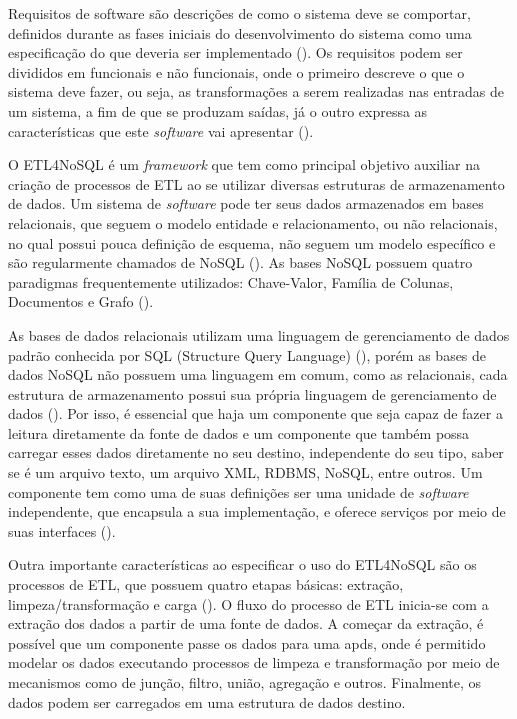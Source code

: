 Requisitos de software são descrições de como o sistema deve se comportar, definidos durante as fases iniciais do desenvolvimento do sistema como uma especificação do que deveria ser implementado (\cite{sommerville:2013}). Os requisitos podem ser divididos em funcionais e não funcionais, onde o primeiro descreve o que o sistema deve fazer, ou seja, as transformações a serem realizadas nas entradas de um sistema, a fim de que se produzam saídas, já o outro expressa as características que este \textit{software} vai apresentar (\cite{sommerville:2013}). 

O ETL4NoSQL é um \textit{framework} que tem como principal objetivo auxiliar na criação de processos de ETL ao se utilizar diversas estruturas de armazenamento de dados. Um sistema de \textit{software} pode ter seus dados armazenados em bases relacionais, que seguem o modelo entidade e relacionamento, ou não relacionais, no qual possui pouca definição de esquema, não seguem um modelo específico e são regularmente chamados de NoSQL (\cite{fowler:2013}). As bases NoSQL possuem quatro paradigmas frequentemente utilizados: Chave-Valor, Família de Colunas, Documentos e Grafo (\cite{fowler:2013}).

As bases de dados relacionais utilizam uma linguagem de gerenciamento de dados padrão conhecida por SQL (Structure Query Language) (\cite{fowler:2013}), porém as bases de dados NoSQL não possuem uma linguagem em comum, como as relacionais, cada estrutura de armazenamento possui sua própria linguagem de gerenciamento de dados (\cite{fowler:2013}). Por isso, é essencial que haja um componente que seja capaz de fazer a leitura diretamente da fonte de dados e um componente que também possa carregar esses dados diretamente no seu destino, independente do seu tipo, saber se é um arquivo texto, um arquivo XML, RDBMS, NoSQL, entre outros. Um componente tem como uma de suas definições ser uma unidade de \textit{software} independente, que encapsula a sua implementação, e oferece serviços por meio de suas interfaces (\cite{itana:2005}).

Outra importante características ao especificar o uso do ETL4NoSQL são os processos de ETL, que possuem quatro etapas básicas: extração, limpeza/transformação e carga (\cite{kimball:2004}). O fluxo do processo de ETL inicia-se com a extração dos dados a partir de uma fonte de dados. A começar da extração, é possível que um componente passe os dados para uma \acp{apd}, onde é permitido modelar os dados executando processos de limpeza e transformação por meio de mecanismos como de junção, filtro, união, agregação e outros. Finalmente, os dados podem ser carregados em uma estrutura de dados destino.

